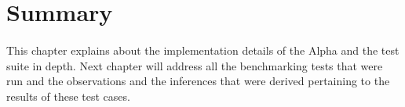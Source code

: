 \section{Summary}

\paragraph{}
This chapter explains about the implementation details of the Alpha and the test suite in depth. Next chapter will address all the benchmarking tests that were run and the observations and the inferences that were derived pertaining to the results of these test cases.